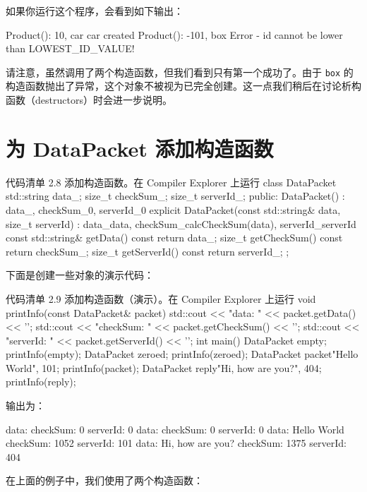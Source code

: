 如果你运行这个程序，会看到如下输出：

\begin{codebox}[cpp]
Product(): 10, car
car created
Product(): -101, box
Error - id cannot be lower than LOWEST_ID_VALUE!
\end{codebox}

请注意，虽然调用了两个构造函数，但我们看到只有第一个成功了。由于 \texttt{box} 的构造函数抛出了异常，这个对象不被视为已完全创建。这一点我们稍后在讨论析构函数（destructors）时会进一步说明。

\section{为 DataPacket 添加构造函数}


\begin{codeboxt}[cpp]{代码清单 2.8 添加构造函数。在 Compiler Explorer 上运行}
class DataPacket {
std::string data_;
size_t checkSum_;
size_t serverId_;
public:
DataPacket() : data_{}, checkSum_{0}, serverId_{0} { }
explicit DataPacket(const std::string& data, size_t serverId)
: data_{data}, checkSum_{calcCheckSum(data)}, serverId_{serverId}
{ }
const std::string& getData() const { return data_; }
size_t getCheckSum() const { return checkSum_; }
size_t getServerId() const { return serverId_; }
};
\end{codeboxt}

下面是创建一些对象的演示代码：

\begin{codeboxt}[cpp]{代码清单 2.9 添加构造函数（演示）。在 Compiler Explorer 上运行}
void printInfo(const DataPacket& packet) {
std::cout << "data: " << packet.getData() << '\n';
std::cout << "checkSum: " << packet.getCheckSum() << '\n';
std::cout << "serverId: " << packet.getServerId() << '\n';
}
int main() {
DataPacket empty;
printInfo(empty);
DataPacket zeroed{};
printInfo(zeroed);
DataPacket packet{"Hello World", 101};
printInfo(packet);
DataPacket reply{"Hi, how are you?", 404};
printInfo(reply);
}
\end{codeboxt}

输出为：

\begin{codebox}[cpp]
data:
checkSum: 0
serverId: 0
data:
checkSum: 0
serverId: 0
data: Hello World
checkSum: 1052
serverId: 101
data: Hi, how are you?
checkSum: 1375
serverId: 404
\end{codebox}

在上面的例子中，我们使用了两个构造函数：

